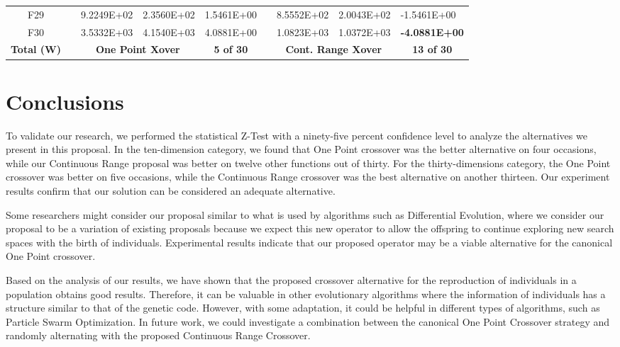 \documentclass[graybox]{svmult}
\begin{document}
\begin{table}[]
\begin{tabular}{@{}cllllllll@{}}
    F29 &  & 9.2249E+02 & 2.3560E+02 & 1.5461E+00 &  & 8.5552E+02 & 2.0043E+02 & -1.5461E+00 \\
    F30 &  & 3.5332E+03 & 4.1540E+03 & 4.0881E+00 &  & 1.0823E+03 & 1.0372E+03 & \textbf{-4.0881E+00} \\
    \textbf{Total   (W)} & \multicolumn{1}{c}{\textbf{}} & \multicolumn{2}{c}{\textbf{One Point   Xover}} & \multicolumn{1}{c}{\textbf{5 of 30}} & \multicolumn{1}{c}{\textbf{}} & \multicolumn{2}{c}{\textbf{Cont. Range   Xover}} & \multicolumn{1}{c}{\textbf{13 of 30}} \\ \bottomrule
    \end{tabular}
    \end{table}

    \FloatBarrier


\section{Conclusions}
    \label{section.conclusions}

    To validate our research, we performed the statistical Z-Test with a ninety-five percent confidence level to analyze the alternatives we present in this proposal. In the ten-dimension category, we found that One Point crossover was the better alternative on four occasions, while our Continuous Range proposal was better on twelve other functions out of thirty. For the thirty-dimensions category, the One Point crossover was better on five occasions, while the Continuous Range crossover was the best alternative on another thirteen. Our experiment results confirm that our solution can be considered an adequate alternative.

    Some researchers might consider our proposal similar to what is used by algorithms such as Differential Evolution, where we consider our proposal to be a variation of existing proposals because we expect this new operator to allow the offspring to continue exploring new search spaces with the birth of individuals. Experimental results indicate that our proposed operator may be a viable alternative for the canonical One Point crossover.

    Based on the analysis of our results, we have shown that the proposed crossover alternative for the reproduction of individuals in a population obtains good results. Therefore, it can be valuable in other evolutionary algorithms where the information of individuals has a structure similar to that of the genetic code. However, with some adaptation, it could be helpful in different types of algorithms, such as Particle Swarm Optimization. In future work, we could investigate a combination between the canonical One Point Crossover strategy and randomly alternating with the proposed Continuous Range Crossover.
\end{document}
